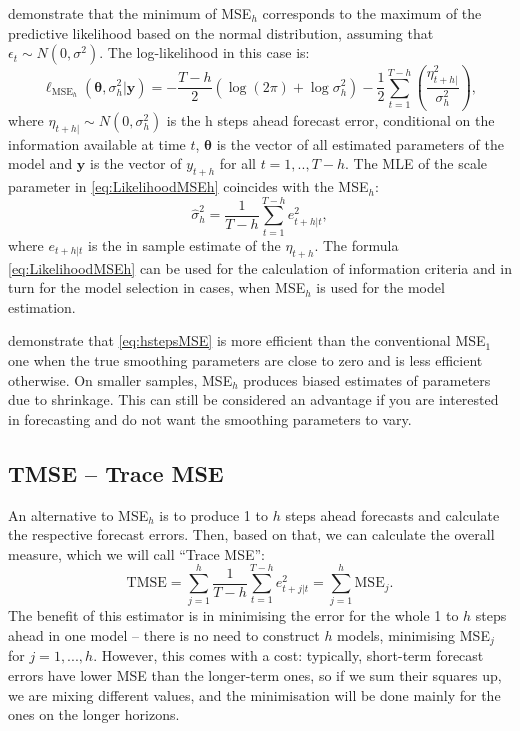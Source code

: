 \documentclass[
]{book}
\theoremstyle{definition}
\theoremstyle{definition}
\theoremstyle{definition}
\theoremstyle{definition}
\theoremstyle{remark}
\begin{document}
\citet{Svetunkov2020Multistep} demonstrate that the minimum of MSE\(_h\) corresponds to the maximum of the predictive likelihood based on the normal distribution, assuming that \(\epsilon_t \sim N(0,\sigma^2)\). The log-likelihood in this case is:
\begin{equation}
    \ell_{\mathrm{MSE}_h}(\boldsymbol{\theta}, {\sigma^2_h} | \mathbf{y}) = -\frac{T-h}{2} \left( \log(2 \pi) + \log \sigma^2_h \right) -\frac{1}{2} \sum_{t=1}^{T-h} \left( \frac{\eta_{t+h|}^2}{\sigma^2_h} \right) ,
  \label{eq:LikelihoodMSEh}
\end{equation}
where \(\eta_{t+h|} \sim N(0, \sigma_h^2)\) is the h steps ahead forecast error, conditional on the information available at time \(t\), \(\boldsymbol{\theta}\) is the vector of all estimated parameters of the model and \(\mathbf{y}\) is the vector of \(y_{t+h}\) for all \(t=1,..,T-h\). The MLE of the scale parameter in \eqref{eq:LikelihoodMSEh} coincides with the MSE\(_h\):
\begin{equation}
    \hat{\sigma}_h^2 = \frac{1}{T-h} \sum_{t=1}^{T-h} e_{t+h|t}^2 ,
  \label{eq:hstepsSigma}
\end{equation}
where \(e_{t+h|t}\) is the in sample estimate of the \(\eta_{t+h}\). The formula \eqref{eq:LikelihoodMSEh} can be used for the calculation of information criteria and in turn for the model selection in cases, when MSE\(_h\) is used for the model estimation.

\citet{Svetunkov2020Multistep} demonstrate that \eqref{eq:hstepsMSE} is more efficient \citep[see Section 4.3 of][]{SvetunkovSBA} than the conventional MSE\(_1\) one when the true smoothing parameters are close to zero and is less efficient otherwise. On smaller samples, MSE\(_h\) produces biased estimates of parameters due to shrinkage. This can still be considered an advantage if you are interested in forecasting and do not want the smoothing parameters to vary.

\hypertarget{multistepLossesTMSE}{%
\subsection{TMSE -- Trace MSE}\label{multistepLossesTMSE}}

An alternative to MSE\(_h\) is to produce 1 to \(h\) steps ahead forecasts and calculate the respective forecast errors. Then, based on that, we can calculate the overall measure, which we will call ``Trace MSE'':
\begin{equation}
    \mathrm{TMSE} = \sum_{j=1}^h \frac{1}{T-h} \sum_{t=1}^{T-h} e_{t+j|t}^2 = \sum_{j=1}^h \mathrm{MSE}_j.
  \label{eq:TMSE}
\end{equation}
The benefit of this estimator is in minimising the error for the whole 1 to \(h\) steps ahead in one model -- there is no need to construct \(h\) models, minimising MSE\(_j\) for \(j=1,...,h\). However, this comes with a cost: typically, short-term forecast errors have lower MSE than the longer-term ones, so if we sum their squares up, we are mixing different values, and the minimisation will be done mainly for the ones on the longer horizons.
\end{document}
